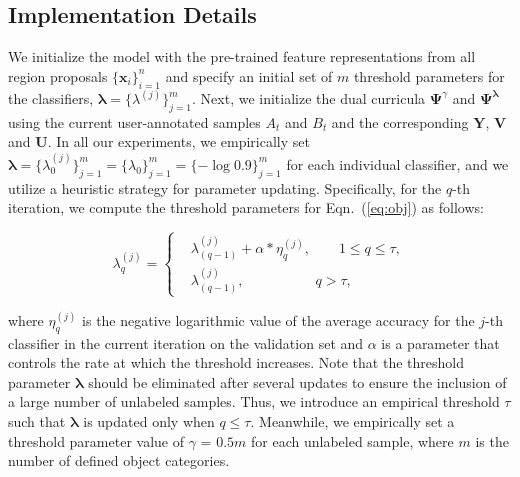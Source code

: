 \documentclass[journal]{IEEEtran}
\begin{document}
{\subsection{Implementation Details}
\label{sec:implement}
We initialize the model with the pre-trained feature representations from all region proposals $\{\mathbf{x}_{i}\}_{i=1}^{n}$ and {specify an initial set of} $m$ threshold parameters for the classifiers, ${\bm \lambda}=\{\lambda^{(j)}\}_{j=1}^{m}$. Next, we initialize the dual curricula $\mathbf{\Psi}^{\gamma}$ and $\mathbf{\Psi}^{\bm \lambda}$ {using the current user-annotated} samples $A_t$ and $B_t$ and the corresponding $\mathbf{Y}$, $\mathbf{V}$ and $\mathbf{U}$. In all our experiments, we empirically set ${\bm \lambda} = \{\lambda^{(j)}_0\}_{j=1}^m=\{ \lambda_0 \}_{j=1}^m=\{-\log0.9\}_{j=1}^m$ for each individual classifier, and we utilize a heuristic strategy for parameter updating. Specifically, for the $q$-th iteration, we compute the threshold parameters for Eqn.~(\ref{eq:obj}) as follows:

\begin{small}
\begin{equation}
\label{eq:lambda}
\lambda^{(j)}_q = \left\{
\begin{aligned}
&\lambda^{(j)}_{(q-1)} + \alpha * \eta^{(j)}_q, \ \ \ \ \ \ \text{ } 1 \le q \le  \tau, \\
&\lambda^{(j)}_{(q-1)}, \ \ \ \ \ \ \ \ \ \ \  \ \ \ \ \ \ \ \ \ \ \ \ q > \tau,
\end{aligned}
\right.
\end{equation}
\end{small}where $\eta^{(j)}_q$ is the negative logarithmic value of the average accuracy for the $j$-th classifier in the current iteration on the validation set and $\alpha$ is a parameter that controls the rate at which the threshold increases. Note that the threshold parameter ${\bm \lambda}$ should be eliminated after several updates to ensure the inclusion of a large number of unlabeled samples. Thus, we introduce an empirical threshold $\tau$ such that ${\bm \lambda}$ is updated only when $q \le \tau$. {Meanwhile, we empirically set a threshold parameter value of $\gamma$ = $0.5m$ for each unlabeled sample, where $m$ is the number of defined object categories.}


}
\end{document}
